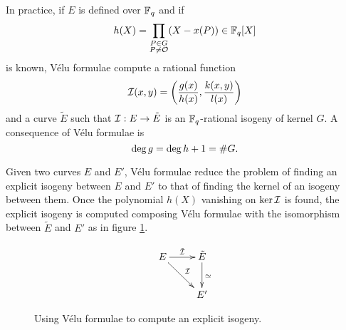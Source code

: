 In practice, if $E$ is defined over $\mathbb{F}_q$ and if
\[h(X) = \prod_{\substack{P\in G\\P\ne\mathcal{O}}}(X - x(P)) \in \mathbb{F}_q[X]\]
is known, Vélu formulae compute a rational function
\begin{equation}
  \label{eq:isog}
  \mathcal{I}(x,y) = \left(\frac{g(x)}{h(x)}, \frac{k(x,y)}{l(x)}\right)  
\end{equation}
and a curve $\tilde{E}$ such that $\mathcal{I} : E\rightarrow\tilde{E}$ is an $\mathbb{F}_q$-rational
isogeny of kernel $G$. A consequence of Vélu formulae is
\begin{equation}
  \label{eq:velu-deg}
  \deg g = \deg h + 1 = \# G
  \text{.}
\end{equation}

Given two curves $E$ and $E'$, Vélu formulae reduce the problem of
finding an explicit isogeny between $E$ and $E'$ to that of finding
the kernel of an isogeny between them. Once the polynomial $h(X)$
vanishing on $\ker\mathcal{I}$ is found, the explicit isogeny is computed
composing Vélu formulae with the isomorphism between $\tilde{E}$ and
$E'$ as in figure \ref{fig:velu}.

\begin{figure}
  \centering
  \[\xymatrix{
    E \ar[r]^{\tilde{\I}} \ar[rd]^\I & \tilde{E} \ar[d]^{\simeq}\\
    & E'
  }\]
  \caption{Using Vélu formulae to compute an explicit isogeny.}
  \label{fig:velu}
\end{figure}




%

